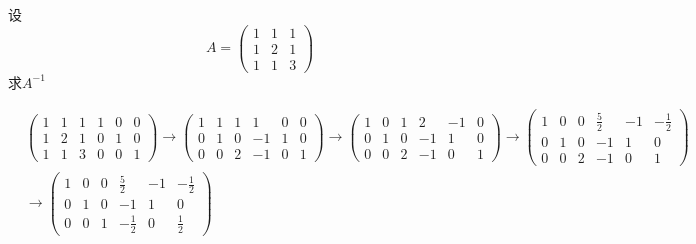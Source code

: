\begin{example}
    设
    \[
        A =
        \begin{pmatrix}
            1 & 1 & 1 \\
            1 & 2 & 1 \\
            1 & 1 & 3
        \end{pmatrix}
    \]
    求$A^{-1}$
\end{example}
\begin{solution}
    \begin{align*}
         & \left(
        \begin{array}{ccc|ccc}
            1 & 1 & 1 & 1 & 0 & 0 \\
            1 & 2 & 1 & 0 & 1 & 0 \\
            1 & 1 & 3 & 0 & 0 & 1
        \end{array}
        \right)
        \rightarrow
        \left(
        \begin{array}{ccc|ccc}
            1 & 1 & 1 & 1  & 0 & 0 \\
            0 & 1 & 0 & -1 & 1 & 0 \\
            0 & 0 & 2 & -1 & 0 & 1
        \end{array}
        \right)
        \rightarrow
        \left(
        \begin{array}{ccc|ccc}
            1 & 0 & 1 & 2  & -1 & 0 \\
            0 & 1 & 0 & -1 & 1  & 0 \\
            0 & 0 & 2 & -1 & 0  & 1
        \end{array}
        \right)
        \rightarrow
        \left(
        \begin{array}{ccc|ccc}
            1 & 0 & 0 & \frac{5}{2} & -1 & -\frac{1}{2} \\
            0 & 1 & 0 & -1          & 1  & 0            \\
            0 & 0 & 2 & -1          & 0  & 1
        \end{array}
        \right)        \\
         & \rightarrow
        \left(
        \begin{array}{ccc|ccc}
            1 & 0 & 0 & \frac{5}{2}  & -1 & -\frac{1}{2} \\
            0 & 1 & 0 & -1           & 1  & 0            \\
            0 & 0 & 1 & -\frac{1}{2} & 0  & \frac{1}{2}
        \end{array}
        \right)
    \end{align*}

\end{solution}
